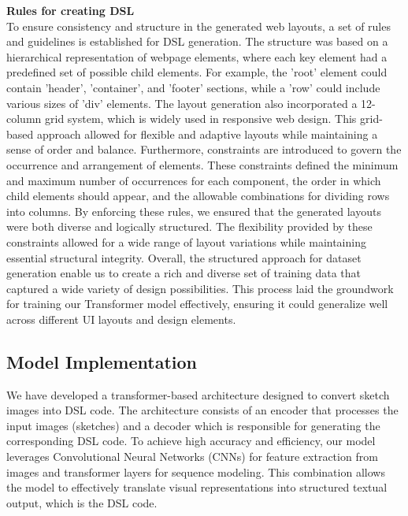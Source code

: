 \textbf{Rules for creating DSL}\\
To ensure consistency and structure in the generated web layouts, a set of rules and guidelines is established for DSL generation. The structure was based on a hierarchical representation of webpage elements, where each key element had a predefined set of possible child elements. For example, the 'root' element could contain 'header', 'container', and 'footer' sections, while a 'row' could include various sizes of 'div' elements. The layout generation also incorporated a 12-column grid system, which is widely used in responsive web design. This grid-based approach allowed for flexible and adaptive layouts while maintaining a sense of order and balance.
Furthermore, constraints are introduced to govern the occurrence and arrangement of elements. These constraints defined the minimum and maximum number of occurrences for each component, the order in which child elements should appear, and the allowable combinations for dividing rows into columns. By enforcing these rules, we ensured that the generated layouts were both diverse and logically structured. The flexibility provided by these constraints allowed for a wide range of layout variations while maintaining essential structural integrity.
Overall, the structured approach for dataset generation enable us to create a rich and diverse set of training data that captured a wide variety of design possibilities. This process laid the groundwork for training our Transformer model effectively, ensuring it could generalize well across different UI layouts and design elements.
\subsection{Model Implementation}
We have developed a transformer-based architecture designed to convert sketch images into DSL code. The architecture consists of an encoder that processes the input images (sketches) and a decoder which is responsible for generating the corresponding DSL code. To achieve high accuracy and efficiency, our model leverages Convolutional Neural Networks (CNNs) for feature extraction from images and transformer layers for sequence modeling. This combination allows the model to effectively translate visual representations into structured textual output, which is the DSL code.
